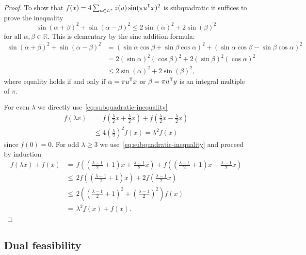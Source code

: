 \documentclass{amsart}
\newcommand{\R}{\mathbb{R}}
\begin{document}
\begin{proof}
To show that $f(x) = 4\sum_{u \in L^*} z(u) \sin(\pi u^{\sf T} x)^2$ is subquadratic it suffices to prove the
inequality
\[
\sin(\alpha + \beta)^2 + \sin(\alpha - \beta)^2 \leq 2 \sin(\alpha)^2 + 2 \sin(\beta)^2
\]
for all $\alpha, \beta \in \R$. This is elementary by the sine
addition formula:
\[
\begin{split}
\sin(\alpha + \beta)^2 + \sin(\alpha - \beta)^2 
& = (\sin \alpha \cos \beta + \sin \beta \cos \alpha)^2 + (\sin \alpha \cos \beta - \sin \beta \cos \alpha)^2\\
& = 2(\sin \alpha)^2 (\cos \beta)^2 + 2(\sin \beta)^2 (\cos \alpha)^2 \\
& \leq 2 \sin(\alpha)^2 + 2 \sin(\beta)^2,
\end{split}
\]
where equality holds if and only if $\alpha = \pi u^{\sf T} x$ or $\beta = \pi u^{\sf T} y$ is an integral multiple
of $\pi$.

For even $\lambda$ we directly use~\eqref{eq:subquadratic-inequality}
\[
\begin{split}
  f(\lambda x) & = \, f\left(\frac{\lambda}{2} x + \frac{\lambda}{2} x\right) + f\left(\frac{\lambda}{2} x - \frac{\lambda}{2} x\right)\\
  & \, \leq 4 \left(\frac{\lambda}{2}\right)^2 f(x) = \lambda^2 f(x)
\end{split}
\]
since $f(0) = 0$. For odd $\lambda \geq 3$ we
use~\eqref{eq:subquadratic-inequality} and proceed by induction
\[
\begin{split}
  f(\lambda x) + f(x) & = \, f\left( \left(\frac{\lambda - 1}{2} + 1 \right)
    x + \frac{\lambda - 1}{2} x \right) + f\left( \left(\frac{\lambda - 1}{2} + 1 \right)
      x - \frac{\lambda - 1}{2} x \right)\\
      & \leq \, 2 f\left( \left(\frac{\lambda - 1}{2} + 1 \right)
        x\right) + 2 f \left(\frac{\lambda - 1}{2} x \right)\\
      & \leq \, 2 \left( \left(\frac{\lambda - 1}{2} + 1 \right)^2 +
        \left(\frac{\lambda - 1}{2}\right)^2 \right) f(x)\\
      & = \, \lambda^2 f(x) + f(x).
\end{split}
 \]
\end{proof}

%

\subsection{Dual feasibility}
\end{document}
